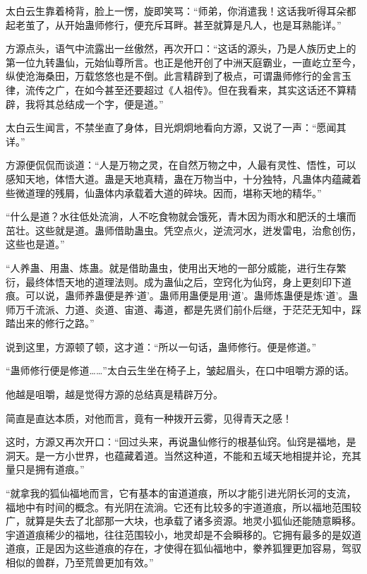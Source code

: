 
\begin{this_body}

太白云生靠着椅背，脸上一愣，旋即笑骂：“师弟，你消遣我！这话我听得耳朵都起老茧了，从开始蛊师修行，便充斥耳畔。甚至就算是凡人，也是耳熟能详。”

方源点头，语气中流露出一丝傲然，再次开口：“这话的源头，乃是人族历史上的第一位九转蛊仙，元始仙尊所言。也正是他开创了中洲天庭霸业，一直屹立至今，纵使沧海桑田，万载悠悠也是不倒。此言精辟到了极点，可谓蛊师修行的金言玉律，流传之广，在如今甚至还要超过《人祖传》。但在我看来，其实这话还不算精辟，我将其总结成一个字，便是道。”

太白云生闻言，不禁坐直了身体，目光炯炯地看向方源，又说了一声：“愿闻其详。”

方源便侃侃而谈道：“人是万物之灵，在自然万物之中，人最有灵性、悟性，可以感知天地，体悟大道。蛊是天地真精，蛊在万物当中，十分独特，凡蛊体内蕴藏着些微道理的残屑，仙蛊体内承载着大道的碎块。因而，堪称天地的精华。”

“什么是道？水往低处流淌，人不吃食物就会饿死，青木因为雨水和肥沃的土壤而茁壮。这些就是道。蛊师借助蛊虫。凭空点火，逆流河水，迸发雷电，治愈创伤，这些也是道。”

“人养蛊、用蛊、炼蛊。就是借助蛊虫，使用出天地的一部分威能，进行生存繁衍，最终体悟天地的道理法则。成为蛊仙之后，空窍化为仙窍，身上更刻印下道痕。可以说，蛊师养蛊便是养‘道’。蛊师用蛊便是用‘道’。蛊师炼蛊便是炼‘道’。蛊师万千流派、力道、炎道、宙道、毒道，都是先贤们前仆后继，于茫茫无知中，踩踏出来的修行之路。”

说到这里，方源顿了顿，这才道：“所以一句话，蛊师修行。便是修道。”

“蛊师修行便是修道……”太白云生坐在椅子上，皱起眉头，在口中咀嚼方源的话。

他越是咀嚼，越是觉得方源的总结真是精辟万分。

简直是直达本质，对他而言，竟有一种拨开云雾，见得青天之感！

这时，方源又再次开口：“回过头来，再说蛊仙修行的根基仙窍。仙窍是福地，是洞天。是一方小世界，也蕴藏着道。当然这种道，不能和五域天地相提并论，充其量只是拥有道痕。”

“就拿我的狐仙福地而言，它有基本的宙道道痕，所以才能引进光阴长河的支流，福地中有时间的概念。有光阴在流淌。它还有比较多的宇道道痕，所以福地范围较广，就算是失去了北部那一大块，也承载了诸多资源。地灵小狐仙还能随意瞬移。宇道道痕稀少的福地，往往范围较小，地灵却是不会瞬移的。它拥有最多的是奴道道痕，正是因为这些道痕的存在，才使得在狐仙福地中，豢养狐狸更加容易，驾驭相似的兽群，乃至荒兽更加有效。”


\end{this_body}
